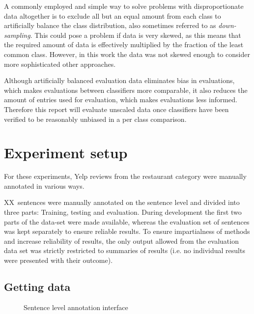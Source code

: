 \documentclass[a4paper,11pt]{kth-mag}
\newcommand{\category}{restaurant category }  %
\newcommand{\numAnnotated}{XX}
\newif\ifhasStudiedFailures
\begin{document}
A commonly employed and simple way to solve problems with disproportionate data altogether is to exclude all but an equal amount from each class to artificially balance the class distribution, also sometimes referred to as \emph{down-sampling}\cite{provost2000machine}. This could pose a problem if data is very skewed, as this means that the required amount of data is effectively multiplied by the fraction of the least common class. However, in this work the data was not skewed enough to consider more sophisticated other approaches.

Although artificially balanced evaluation data eliminates bias in evaluations, which makes evaluations between classifiers more comparable, it also reduces the amount of entries used for evaluation, which makes evaluations less informed. Therefore this report will evaluate unscaled data once classifiers have been verified to be reasonably unbiased in a per class comparison.

\section{Experiment setup}
For these experiments, Yelp reviews from the \category were manually annotated in various ways.

\numAnnotated~sentences were manually annotated on the sentence level and divided into three parts: Training, testing and evaluation. During development the first two parts of the data-set were made available, whereas the evaluation set of sentences was kept separately to ensure reliable results. To ensure impartialness of methods and increase reliability of results, the only output allowed from the evaluation data set was strictly restricted to summaries of results (i.e. no individual results were presented with their outcome)\ifhasStudiedFailures, except for when failing instances were explicitly studied after method development was finished\fi.

\newpage
\subsection{Getting data}
\label{subsec:getting_data}
\begin{figure}[h]
  \centering
  \caption{Sentence level annotation interface}
  \label{fig:annotate_sentence}
\end{figure}
\end{document}
